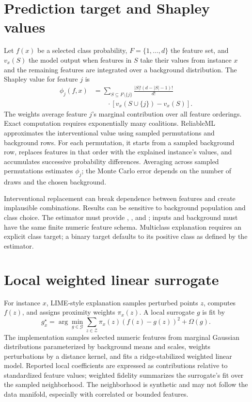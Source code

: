 \documentclass[conference]{IEEEtran}
\begin{document}
\section{Prediction target and Shapley values}
Let \(f(x)\) be a selected class probability, \(F=\{1,\ldots,d\}\) the feature set, and \(v_x(S)\) the model output when features in \(S\) take their values from instance \(x\) and the remaining features are integrated over a background distribution. The Shapley value for feature \(j\) is
\[
\begin{aligned}
\phi_j(f,x)
&=\sum_{S\subseteq F\setminus\{j\}}
\frac{|S|!(d-|S|-1)!}{d!}\\
&\qquad\cdot\left[v_x(S\cup\{j\})-v_x(S)\right].
\end{aligned}
\]
The weights average feature \(j\)'s marginal contribution over all feature orderings. Exact computation requires exponentially many coalitions. ReliableML approximates the interventional value using sampled permutations and background rows. For each permutation, it starts from a sampled background row, replaces features in that order with the explained instance's values, and accumulates successive probability differences. Averaging across sampled permutations estimates \(\phi_j\); the Monte Carlo error depends on the number of draws and the chosen background.

Interventional replacement can break dependence between features and create implausible combinations. Results can be sensitive to background population and class choice. The estimator must provide , , and ; inputs and background must have the same finite numeric feature schema. Multiclass explanation requires an explicit class target; a binary target defaults to its positive class as defined by the estimator.

\section{Local weighted linear surrogate}
For instance \(x\), LIME-style explanation samples perturbed points \(z\), computes \(f(z)\), and assigns proximity weights \(\pi_x(z)\). A local surrogate \(g\) is fit by
\[
g_x^\star=\arg\min_{g\in\mathcal G}
\sum_{z\in\mathcal Z}\pi_x(z)\left(f(z)-g(z)\right)^2+\Omega(g).
\]
The implementation samples selected numeric features from marginal Gaussian distributions parameterized by background means and scales, weights perturbations by a distance kernel, and fits a ridge-stabilized weighted linear model. Reported local coefficients are expressed as contributions relative to standardized feature values; weighted fidelity summarizes the surrogate's fit over the sampled neighborhood. The neighborhood is synthetic and may not follow the data manifold, especially with correlated or bounded features.
\end{document}
